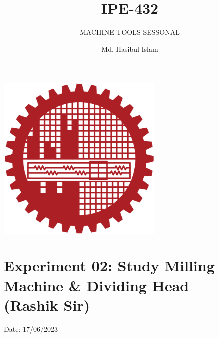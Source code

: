 \documentclass{article}
\title{IPE-432}
\author{Md. Hasibul Islam}
\subtitle{MACHINE TOOLS SESSONAL}
\begin{document}
\begin{titlepage}
    \centering
    
    {\Huge\bfseries\maketitle}
    \vspace{2cm}
    \includegraphics[width=8cm]{institution_logo.jpg}
    \vfill
    \vspace*{2cm}
\end{titlepage}

\tableofcontents
\pagebreak
\section{Experiment 02: Study Milling Machine \& Dividing Head\\ (Rashik Sir)} 
\hfill Date: 17/06/2023
\end{document}
